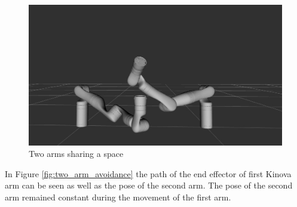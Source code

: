 \documentclass[a4paper, 10pt, conference]{ieeeconf}      %
\begin{document}
\begin{figure}[H]
	\centering
	\includegraphics[scale=0.15]{images/two_arms.jpeg}
	\caption{Two arms sharing a space}
	\label{fig:two_arms}
\end{figure}

In Figure \ref{fig:two_arm_avoidance} the path of the end effector of first Kinova arm can be seen as well as the pose of the second arm. The pose of the second arm remained constant during the movement of the first arm. 
\end{document}
